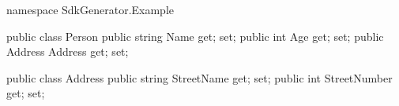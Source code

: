 \begin{csharp}
namespace SdkGenerator.Example

public class Person 
{
    public string Name {get; set;}
    public int Age {get; set;}
    public Address Address {get; set;}
}

public class Address 
{
    public string StreetName {get; set;}
    public int StreetNumber {get; set;}
}
\end{csharp}